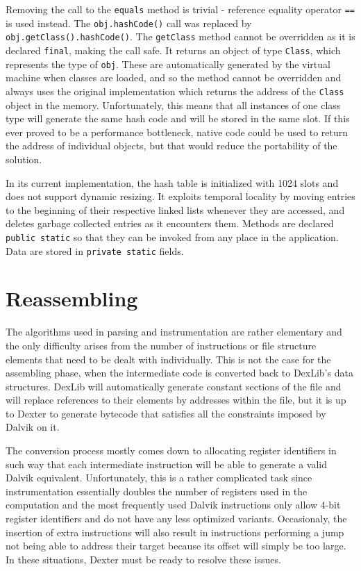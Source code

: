 \documentclass[12pt,twoside,notitlepage]{report}
\begin{document}
Removing the call to the \verb$equals$ method is trivial - reference equality operator \verb$==$ is used instead. The \verb$obj.hashCode()$ call was replaced by \verb$obj.getClass().hashCode()$. The \verb$getClass$ method cannot be overridden as it is declared \verb$final$, making the call safe. It returns an object of type \verb$Class$, which represents the type of \verb$obj$. These are automatically generated by the virtual machine when classes are loaded, and so the method cannot be overridden and always uses the original implementation which returns the address of the \verb$Class$ object in the memory. Unfortunately, this means that all instances of one class type will generate the same hash code and will be stored in the same slot. If this ever proved to be a performance bottleneck, native code could be used to return the address of individual objects, but that would reduce the portability of the solution. 

In its current implementation, the hash table is initialized with 1024 slots and does not support dynamic resizing. It exploits temporal locality by moving entries to the beginning of their respective linked lists whenever they are accessed, and deletes garbage collected entries as it encounters them. Methods are declared \verb$public static$ so that they can be invoked from any place in the application. Data are stored in \verb$private static$ fields.

\section{Reassembling}

The algorithms used in parsing and instrumentation are rather elementary and the only difficulty arises from the number of instructions or file structure elements that need to be dealt with individually. This is not the case for the assembling phase, when the intermediate code is converted back to DexLib's data structures. DexLib will automatically generate constant sections of the file and will replace references to their elements by addresses within the file, but it is up to Dexter to generate bytecode that satisfies all the constraints imposed by Dalvik on it. 

The conversion process mostly comes down to allocating register identifiers in such way that each intermediate instruction will be able to generate a valid Dalvik equivalent. Unfortunately, this is a rather complicated task since instrumentation essentially doubles the number of registers used in the computation and the most frequently used Dalvik instructions only allow 4-bit register identifiers and do not have any less optimized variants. Occasionaly, the insertion of extra instructions will also result in instructions performing a jump not being able to address their target because its offset will simply be too large. In these situations, Dexter must be ready to resolve these issues.
\end{document}
